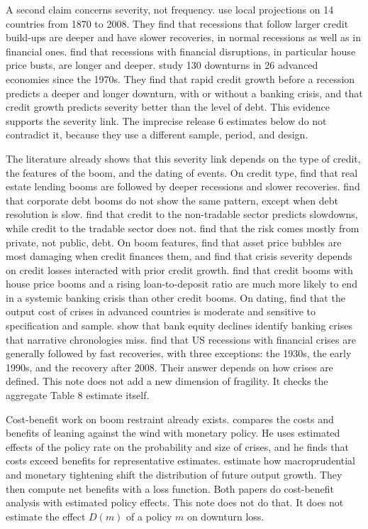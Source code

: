 \documentclass[11pt]{article}
\begin{document}
A second claim concerns severity, not frequency. \citet{jst2013} use local projections on 14
countries from 1870 to 2008. They find that recessions that follow larger credit build-ups
are deeper and have slower recoveries, in normal recessions as well as in financial ones.
\citet{claessens2012} find that recessions with financial disruptions, in particular house
price busts, are longer and deeper. \citet{bridges2017} study 130 downturns in 26 advanced
economies since the 1970s. They find that rapid credit growth before a recession predicts a
deeper and longer downturn, with or without a banking crisis, and that credit growth
predicts severity better than the level of debt. This evidence supports the severity link.
The imprecise release 6 estimates below do not contradict it, because they use a different
sample, period, and design.

The literature already shows that this severity link depends on the type of credit, the
features of the boom, and the dating of events. On credit type, \citet{jst2016mortgaging}
find that real estate lending booms are followed by deeper recessions and slower
recoveries. \citet{jkst2022} find that corporate debt booms do not show the same pattern,
except when debt resolution is slow. \citet{mullerverner2024} find that credit to the
non-tradable sector predicts slowdowns, while credit to the tradable sector does not.
\citet{jst2016sovereigns} find that the risk comes mostly from private, not public, debt.
On boom features, \citet{jst2015bubbles} find that asset price bubbles are most damaging
when credit finances them, and \citet{krishnamurthymuir2025} find that crisis severity
depends on credit losses interacted with prior credit growth. \citet{rsw2021} find that
credit booms with house price booms and a rising loan-to-deposit ratio are much more likely
to end in a systemic banking crisis than other credit booms. On dating,
\citet{romerromer2017} find that the output cost of crises in advanced countries is moderate
and sensitive to specification and sample. \citet{baron2021} show that bank equity declines
identify banking crises that narrative chronologies miss. \citet{bordohaubrich2017} find
that US recessions with financial crises are generally followed by fast recoveries, with
three exceptions: the 1930s, the early 1990s, and the recovery after 2008. Their answer
depends on how crises are defined. This note does
not add a new dimension of fragility. It checks the aggregate Table 8 estimate itself.

Cost-benefit work on boom restraint already exists. \citet{svensson2017} compares the costs
and benefits of leaning against the wind with monetary policy. He uses estimated effects of
the policy rate on the probability and size of crises, and he finds that costs exceed
benefits for representative estimates. \citet{bgnn2020} estimate how macroprudential and
monetary tightening shift the distribution of future output growth. They then compute net
benefits with a loss function. Both papers do cost-benefit analysis with estimated policy
effects. This note does not do that. It does not estimate the effect $D(m)$ of a policy $m$
on downturn loss.
\end{document}
